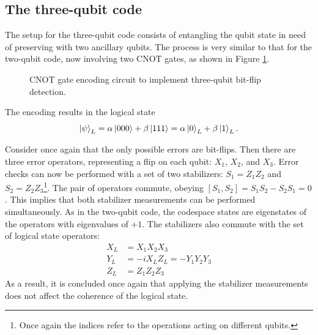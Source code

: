 \subsection{The three-qubit code}

The setup for the three-qubit code consists of entangling the qubit state in need of preserving with two ancillary qubits. The process is very similar to that for the two-qubit code, now involving two CNOT gates, as shown in Figure \ref{fig:three_qub_enc}.
\begin{figure}
    \centering
    \caption{CNOT gate encoding circuit to implement three-qubit bit-flip detection.}
    \label{fig:three_qub_enc}
\end{figure}
The encoding results in the logical state
\begin{equation}
    \ket{\psi}_L = \alpha \ket{000} +\beta \ket{111}=\alpha \ket{0}_L +\beta \ket{1}_L.
\end{equation}

Consider once again that the only possible errors are bit-flips. Then there are three error operators, representing a flip on each qubit: $X_1$, $X_2$, and $X_3$. Error checks can now be performed with a set of two stabilizers: $S_1=Z_1Z_2$ and $S_2=Z_2Z_3$\footnote{Once again the indices refer to the operations acting on different qubits.}. The pair of operators commute, obeying $\left[S_1,S_2\right]=S_1S_2-S_2S_1=0$. This implies that both stabilizer measurements can be performed simultaneously. As in the two-qubit code, the codespace states are eigenstates of the operators with eigenvalues of $+1$. The stabilizers also commute with the set of logical state operators:
\begin{eqnarray}
    X_L&=X_1X_2X_3 \\
    Y_L&=-iX_LZ_L=-Y_1Y_2Y_3\\
    Z_L&=Z_1Z_2Z_3
\end{eqnarray}
As a result, it is concluded once again that applying the stabilizer measurements does not affect the coherence of the logical state.

